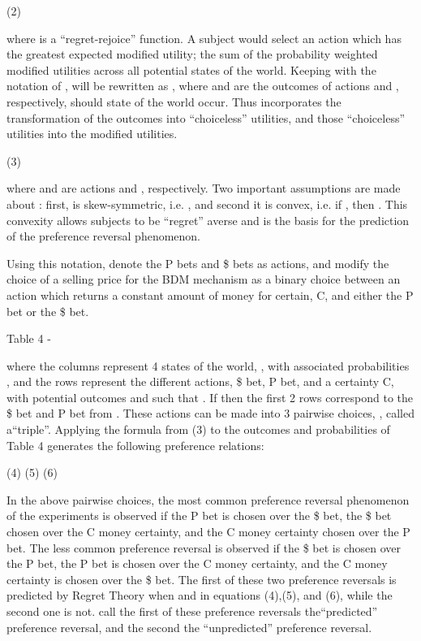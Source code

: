 (2)	

where  is a \enquote{regret-rejoice} function. 
A subject would select an action which has the greatest expected modified utility; the sum of the probability weighted modified utilities across all potential states of the world.
Keeping with the notation of \textcite{Loomes1989}, will be rewritten as , where  and  are the outcomes of actions  and , respectively, should state of the world  occur.
Thus  incorporates the transformation of the outcomes into \enquote{choiceless} utilities, and those \enquote{choiceless} utilities into the modified utilities.


(3)	

where  and  are actions  and , respectively.
Two important assumptions are made about : first,  is skew-symmetric, i.e. , and second it is convex, i.e. if , then .
This convexity allows subjects to be \enquote{regret} averse and is the basis for the prediction of the preference reversal phenomenon.

Using this notation, \textcite{Loomes1989} denote the P bets and \$ bets as actions, and modify the choice of a selling price for the BDM mechanism as a binary choice between an action which returns a constant amount of money for certain, C, and either the P bet or the \$ bet.

Table 4 -  \textcite{Loomes1989}

where the columns represent 4 states of the world, , with associated probabilities , and the rows represent the different actions, \$ bet, P bet, and a certainty C, with potential outcomes  and  such that .
If  then the first 2 rows correspond to the \$ bet and P bet from \textcite{Grether1979}.
These actions can be made into 3 pairwise choices, , called a\enquote{triple}.
Applying the formula from (3) to the outcomes and probabilities of Table 4 generates the following preference relations:

(4)	
(5)	
(6)	

In the above pairwise choices, the most common preference reversal phenomenon of the \textcite{Grether1979} experiments is observed if the P bet is chosen over the \$ bet, the \$ bet chosen over the C money certainty, and the C money certainty chosen over the P bet.
The less common preference reversal is observed if the \$ bet is chosen over the P bet, the P bet is chosen over the C money certainty, and the C money certainty is chosen over the \$ bet.
The first of these two preference reversals is predicted by Regret Theory when  and  in equations (4),(5), and (6), while the second one is not.
\textcite[143]{Loomes1989} call the first of these preference reversals the\enquote{predicted} preference reversal, and the second the \enquote{unpredicted} preference reversal.

